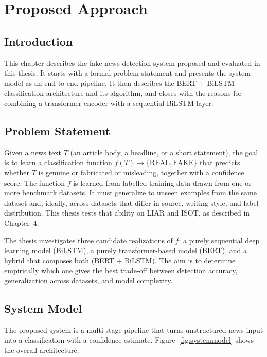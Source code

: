 \sloppy
\chapter{Proposed Approach}
\section{Introduction}

This chapter describes the fake news detection system proposed and evaluated in this thesis. It starts with a formal problem statement and presents the system model as an end-to-end pipeline. It then describes the BERT + BiLSTM classification architecture and its algorithm, and closes with the reasons for combining a transformer encoder with a sequential BiLSTM layer.

\section{Problem Statement}

Given a news text $T$ (an article body, a headline, or a short statement), the goal is to learn a classification function $f(T) \rightarrow \{\text{REAL}, \text{FAKE}\}$ that predicts whether $T$ is genuine or fabricated or misleading, together with a confidence score. The function $f$ is learned from labelled training data drawn from one or more benchmark datasets. It must generalize to unseen examples from the same dataset and, ideally, across datasets that differ in source, writing style, and label distribution. This thesis tests that ability on LIAR and ISOT, as described in Chapter~4.

The thesis investigates three candidate realizations of $f$: a purely sequential deep learning model (BiLSTM), a purely transformer-based model (BERT), and a hybrid that composes both (BERT + BiLSTM). The aim is to determine empirically which one gives the best trade-off between detection accuracy, generalization across datasets, and model complexity.

\section{System Model}

The proposed system is a multi-stage pipeline that turns unstructured news input into a classification with a confidence estimate. Figure~\ref{fig:systemmodel} shows the overall architecture.

